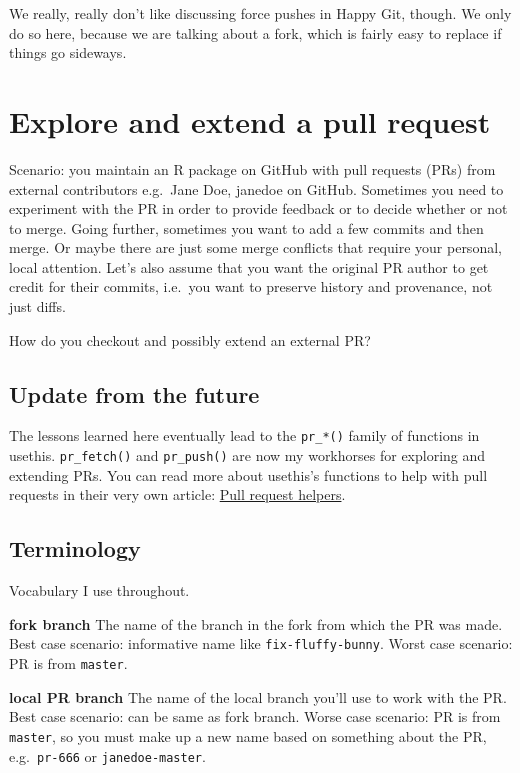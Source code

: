 \documentclass[
]{book}
\begin{document}
We really, really don't like discussing force pushes in Happy Git, though.
We only do so here, because we are talking about a fork, which is fairly easy to replace if things go sideways.

\chapter{Explore and extend a pull request}\label{pr-extend}

Scenario: you maintain an R package on GitHub with pull requests (PRs) from external contributors e.g.~Jane Doe, janedoe on GitHub. Sometimes you need to experiment with the PR in order to provide feedback or to decide whether or not to merge. Going further, sometimes you want to add a few commits and then merge. Or maybe there are just some merge conflicts that require your personal, local attention. Let's also assume that you want the original PR author to get credit for their commits, i.e.~you want to preserve history and provenance, not just diffs.

How do you checkout and possibly extend an external PR?

\section{Update from the future}\label{update-from-the-future}

The lessons learned here eventually lead to the \texttt{pr\_*()} family of functions in usethis.
\texttt{pr\_fetch()} and \texttt{pr\_push()} are now my workhorses for exploring and extending PRs.
You can read more about usethis's functions to help with pull requests in their very own article: \href{https://usethis.r-lib.org/articles/pr-functions.html}{Pull request helpers}.

\section{Terminology}\label{terminology}

Vocabulary I use throughout.

\textbf{fork branch} The name of the branch in the fork from which the PR was made. Best case scenario: informative name like \texttt{fix-fluffy-bunny}. Worst case scenario: PR is from \texttt{master}.

\textbf{local PR branch} The name of the local branch you'll use to work with the PR. Best case scenario: can be same as fork branch. Worse case scenario: PR is from \texttt{master}, so you must make up a new name based on something about the PR, e.g.~\texttt{pr-666} or \texttt{janedoe-master}.
\end{document}
